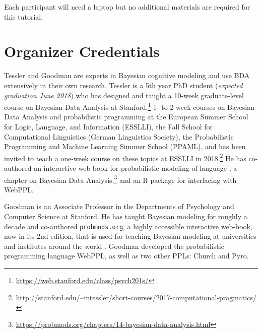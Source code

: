 \documentclass[10pt,letterpaper]{article}
\begin{document}
Each participant will need a laptop but no additional materials are required for this tutorial. 

\section{Organizer Credentials}

Tessler and Goodman are experts in Bayesian cognitive modeling and use BDA extensively in their own research. 
Tessler is a 5th year PhD student (\emph{expected graduation June 2018}) who has designed and taught a 10-week graduate-level course on Bayesian Data Analysis at Stanford,\footnote{
\url{https://web.stanford.edu/class/psych201s/}} 1- to 2-week courses on Bayesian Data Analysis and probabilistic programming at the European Summer School for Logic, Language, and Information (ESSLLI), the Fall School for Computational Linguistics (German Linguistics Society), the Probabilistic Programming and Machine Learning Summer School (PPAML), and has been invited to teach a one-week course on these topics at ESSLLI in 2018.\footnote{\url{http://stanford.edu/~mtessler/short-courses/2017-computational-pragmatics/}}
He has co-authored an interactive web-book for probabilistic modeling of language \cite{problang}, a chapter on Bayesian Data Analysis,\footnote{\url{https://probmods.org/chapters/14-bayesian-data-analysis.html}} and an R package for interfacing with WebPPL.

Goodman is an Associate Professor in the Departments of Psychology and Computer Science at Stanford. 
He has taught Bayesian modeling for roughly a decade and co-authored \texttt{probmods.org}, a highly accessible interactive web-book, now in its 2nd edition, that is used for teaching Bayesian modeling at universities and institutes around the world \cite{probmods2}. 
Goodman developed the probabilistic programming language WebPPL, as well as two other PPLs: Church \cite{church} and Pyro.





\setlength{\bibleftmargin}{.125in}
\setlength{\bibindent}{-\bibleftmargin}


\end{document}
